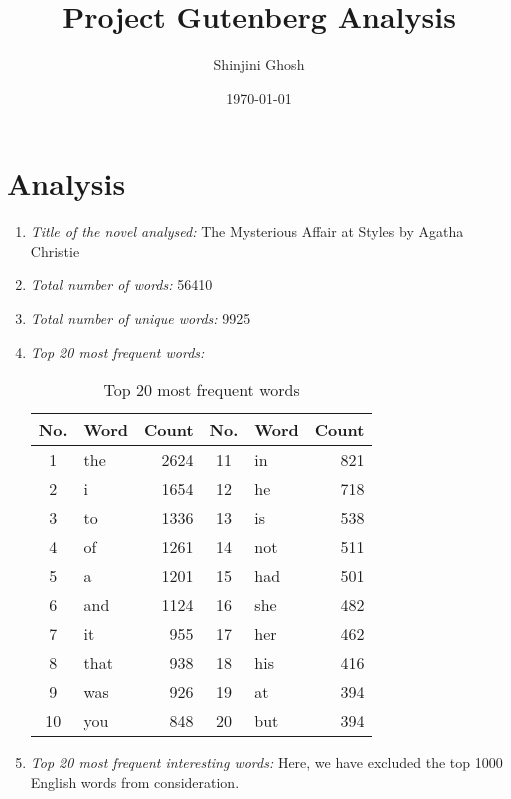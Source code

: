 \documentclass[12pt]{article}
\title{Project Gutenberg Analysis}
\author{Shinjini Ghosh}
\date{\today}
\begin{document}
\maketitle

\section*{Analysis}

\begin{enumerate}
  \item \textit{Title of the novel analysed:} The Mysterious Affair at Styles by Agatha Christie
  \item \textit{Total number of words:} 56410
  \item \textit{Total number of unique words:} 9925
  \item \textit{Top 20 most frequent words:}
        \begin{table}[h]
          \centering
          \begin{tabular}{c|l|r||c|l|r}
            \toprule
            No. & Word & Count & No. & Word & Count \\
            \midrule
            1 & the & 2624 & 11 & in & 821 \\
            2 & i & 1654 & 12 & he & 718 \\
            3 & to & 1336 & 13 & is & 538 \\
            4 & of & 1261 & 14 & not & 511 \\
            5 & a & 1201 & 15 & had & 501 \\
            6 & and & 1124 & 16 & she & 482 \\
            7 & it & 955 & 17 & her & 462 \\
            8 & that & 938 & 18 & his & 416 \\
            9 & was & 926 & 19 & at & 394 \\
            10 & you & 848 & 20 & but & 394 \\
            \bottomrule
          \end{tabular}
          \caption{Top 20 most frequent words}
          \label{top20}
        \end{table}
  \item \textit{Top 20 most frequent interesting words:} Here, we have excluded the top 1000 English words from consideration.
        \begin{table}[H]
          \centering
          \begin{tabular}{c|l|r||c|l|r}

\end{tabular}
\end{table}
\end{enumerate}
\end{document}
